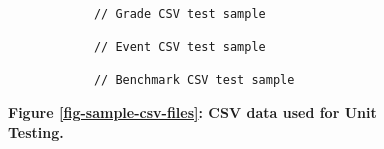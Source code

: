\begin{figure}[H]
    \centering
    \begin{mdframed}[rightline=false,leftline=false]
        \centering
        \begin{BVerbatim}[fontsize=\tiny]

            // Grade CSV test sample

            // Event CSV test sample

            // Benchmark CSV test sample

        \end{BVerbatim}
    \end{mdframed}
    \caption[CSVs for Unit Testing]{\textbf{Figure \ref{fig-sample-csv-files}: CSV data used for Unit Testing.}}
    \label{fig-2-way-csv-output}
\end{figure}
